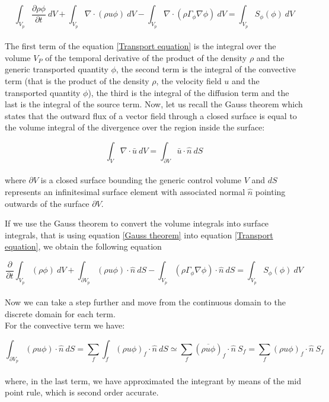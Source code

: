 \documentclass[a5paper]{sapthesis}
\begin{document}
	\begin{equation} 
		\int_{V_{p}}{{\dfrac{\partial{\rho \phi}}{\partial{t}}}}\ dV + \int_{V_{p}}{\nabla \cdot (\rho u \phi)}\ dV - \int_{V_{p}}{\nabla \cdot (\rho \Gamma_{\phi} \nabla\phi)}\ dV = \int_{V_{p}}{S_{\phi}(\phi)}\ dV
		\label{Transport equation}
	\end{equation}
	\\
	The first term of the equation \ref{Transport equation} is the integral over the volume $V_{P}$ of the temporal derivative of the product of the density $\rho$ and the generic transported quantity $\phi$, the second term is the integral of the convective term (that is the product of the density $\rho$, the velocity field $u$ and the transported quantity $\phi$), the third is the integral of the diffusion term and the last is the integral of the source term. 
	Now, let us recall the Gauss theorem which states that the outward flux of a vector field through a closed surface is equal to the volume integral of the divergence over the region inside the surface:
	
	\begin{equation}
		\int_{V}{\nabla \cdot \bar{u} \ }dV = \int_{\partial{V}}{\bar{u} \cdot \hat{n} \ dS}
		\label{Gauss theorem}
	\end{equation}
	\\
	where $\partial{V}$ is a closed surface bounding the generic control volume $V$ and $dS$ represents an infinitesimal surface element with associated normal $\hat{n}$ pointing outwards of the surface $\partial{V}$.
	
	If we use the Gauss theorem to convert the volume integrals into surface integrals, that is using equation \ref{Gauss theorem} into equation \ref{Transport equation}, we obtain the following equation
	
	\begin{equation}
		\dfrac{\partial}{\partial{t}}\int_{V_{p}}{{(\rho \phi)}}\ dV + \int_{\partial{V_{p}}}{ (\rho u \phi)\cdot \hat{n}}\ dS - \int_{V_{p}}{(\rho \Gamma_{\phi} \nabla\phi)\cdot \hat{n}}\ dS = \int_{V_{p}}{S_{\phi}(\phi)}\ dV
		\label{Transport equation_2}
	\end{equation}
	\\
	Now we can take a step further and move from the continuous domain to the discrete domain for each term.\\ 
	\indent For the convective term we have:
	
	\begin{equation}
		\int_{\partial{V_{p}}}{(\rho u \phi)} \cdot \hat{n}\ dS = \sum_{f}\int_{f}{(\rho u \phi)_{f}} \cdot \hat{n}\ dS \simeq \sum_{f} (\overline{\rho u \phi})_{f} \cdot \hat{n} \ S_{f} = \sum_{f} (\rho u \phi)_{f} \cdot \hat{n} \ S_{f}
		\label{convective discrete}
	\end{equation}
	\\
	where, in the last term, we have approximated the integrant by means of the mid point rule, which is second order accurate.
	
\end{document}
